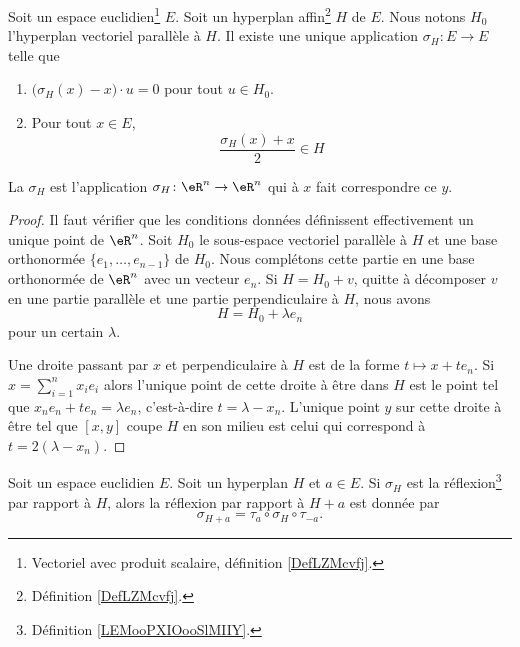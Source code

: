 \begin{lemmaDef}		\label{LEMooPXIOooSlMIIY}
	Soit un espace euclidien\footnote{Vectoriel avec produit scalaire, définition \ref{DefLZMcvfj}.} \( E\). Soit un hyperplan affin\footnote{Définition \ref{DefLZMcvfj}.} \( H\) de \(E\). Nous notons \( H_0\) l'hyperplan vectoriel parallèle à \( H\). Il existe une unique application \(\sigma_H \colon E\to E  \) telle que
	\begin{enumerate}
		\item
		      \( \big( \sigma_H(x)-x \big)\cdot u=0\) pour tout \( u\in H_0\).
		\item
		      Pour tout \( x\in E\),
		      \begin{equation}
			      \frac{ \sigma_H(x)+x }{2}\in H
		      \end{equation}
	\end{enumerate}
	La  \( \sigma_H\) est l'application \( \sigma_H\colon \eR^n\to \eR^n \) qui à \( x\) fait correspondre ce \( y\).
\end{lemmaDef}

\begin{proof}
	Il faut vérifier que les conditions données définissent effectivement un unique point de \( \eR^n\). Soit \( H_0\) le sous-espace vectoriel parallèle à \( H\) et une base orthonormée \( \{ e_1,\ldots, e_{n-1} \}\) de \( H_0\). Nous complétons cette partie en une base orthonormée de \( \eR^n\) avec un vecteur \( e_n\). Si \( H=H_0+v\), quitte à décomposer \( v\) en une partie parallèle et une partie perpendiculaire à \( H\), nous avons
	\begin{equation}
		H=H_0+\lambda e_n
	\end{equation}
	pour un certain \( \lambda\).

	Une droite passant par \( x\) et perpendiculaire à \( H\) est de la forme \( t\mapsto x+te_n\). Si \( x=\sum_{i=1}^{n}x_ie_i\) alors l'unique point de cette droite à être dans \( H\) est le point tel que \(   x_ne_n+te_n=\lambda e_n   \), c'est-à-dire \( t=\lambda-x_n\). L'unique point \( y\) sur cette droite à être tel que \( [x,y ]\) coupe \( H\) en son milieu est celui qui correspond à \( t=2(\lambda-x_n)\).
\end{proof}


\begin{proposition}	\label{PROPooVQOTooUEGYiY}
	Soit un espace euclidien \( E\). Soit un hyperplan \( H\) et \( a\in E\). Si \( \sigma_H\) est la réflexion\footnote{Définition \ref{LEMooPXIOooSlMIIY}.} par rapport à \( H\), alors la réflexion par rapport à \( H+a\) est donnée par
	\begin{equation}
		\sigma_{H+a}=\tau_a\circ\sigma_H\circ\tau_{-a}.
	\end{equation}
\end{proposition}

